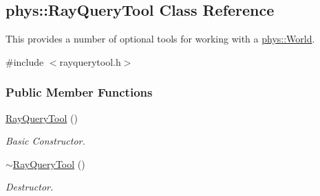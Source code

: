 \hypertarget{classphys_1_1RayQueryTool}{
\subsection{phys::RayQueryTool Class Reference}
\label{classphys_1_1RayQueryTool}
}


This provides a number of optional tools for working with a \hyperlink{classphys_1_1World}{phys::World}.  




{\ttfamily \#include $<$rayquerytool.h$>$}

\subsubsection*{Public Member Functions}
\begin{DoxyCompactItemize}
\item 
\hyperlink{classphys_1_1RayQueryTool_a84d018a05dfa069066a22ce8a20b43ec}{RayQueryTool} ()
\begin{DoxyCompactList}\small\item\em Basic Constructor. \item\end{DoxyCompactList}\item 
\hyperlink{classphys_1_1RayQueryTool_aef5f45a61870962a556a0a65f4a7080f}{$\sim$RayQueryTool} ()
\begin{DoxyCompactList}\small\item\em Destructor. \item\end{DoxyCompactList}\end{DoxyCompactItemize}
